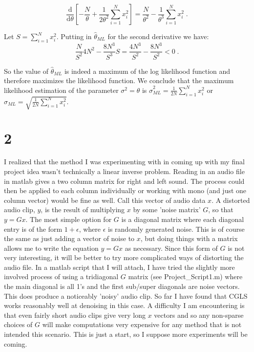 \documentclass[11pt]{article}
\begin{document}
$$\frac{\text{d}}{\text{d}\theta} \left[-\frac{N}{\theta} + \frac{1}{2\theta^2}\sum_{i=1}^N x_i^2\right] = \frac{N}{\theta^2} - \frac{1}{\theta^3}\sum_{i= 1}^N x_i^2 \;.$$

Let $S = \sum_{i=1}^N x_i^2$. Putting in $\hat{\theta}_{ML}$ for the second derivative we have:
$$ \frac{N}{S^2}4N^2- \frac{8N^3}{S^3}S = \frac{4N^3}{S^2} - \frac{8N^3}{S^2} < 0 \;.$$

So the value of $\hat{\theta}_{ML}$ is indeed a maximum of the log likelihood function and therefore maximizes the likelihood function. We conclude that the maximum likelihood estimation of the parameter $\sigma^2 = \theta$ is $\hat{\sigma}^2_{ML} = \frac{1}{2N}\sum_{i=1}^N x_i^2$ or $\hat{\sigma}_{ML} = \sqrt{\frac{1}{2N}\sum_{i=1}^N x_i^2}$. 

\section*{2}

I realized that the method I was experimenting with in coming up with my final project idea wasn't technically a  linear inverse problem. Reading in an audio file in matlab gives a two column matrix for right and left sound. The process could then be applied to each column individually or working with mono (and just one column vector) would be fine as well. Call this vector of audio data $x$. A distorted audio clip, $y$, is the result of multiplying $x$ by some 'noise matrix' $G$, so that $y = Gx$. The most simple option for $G$ is a diagonal matrix where each diagonal entry is of the form $1 + \epsilon$, where $\epsilon$ is randomly generated noise. This is of course the same as just adding a vector of noise to $x$, but doing things with a matrix allows me to write the equation $y = Gx$ as necessary. Since this form of $G$ is not very interesting, it will be better to try more complicated ways of distorting the audio file. In a matlab script that I will attach, I have tried the slightly more involved process of using a tridiagonal $G$ matrix (see Project\_Script1.m) where the main diagonal is all 1's and the first sub/super diagonals are noise vectors. This does produce a noticeably 'noisy' audio clip.  So far I have found that CGLS works reasonably well at denoising in this case. A difficulty I am encountering is that even fairly short audio clips give very long $x$ vectors and so any non-sparse choices of $G$ will make computations very expensive for any method that is not intended this scenario. This is just a start, so I suppose more experiments will be coming. 
\end{document}

